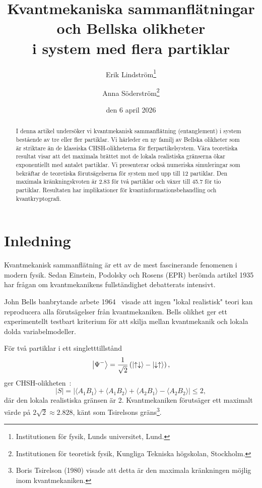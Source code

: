 \documentclass[12pt,a4paper]{article}
\title{Kvantmekaniska sammanfl\"atningar och Bellska olikheter\\
i system med flera partiklar}
\author{%
  Erik Lindstr\"om\thanks{Institutionen f\"or fysik, Lunds universitet, Lund.}
  \and
  Anna S\"oderstr\"om\thanks{Institutionen f\"or teoretisk fysik,
  Kungliga Tekniska h\"ogskolan, Stockholm.}
}
\date{den 6 april 2026}
\theoremstyle{plain}
\theoremstyle{definition}
\theoremstyle{remark}
\begin{document}
\maketitle

\begin{abstract}
I denna artikel unders\"oker vi kvantmekanisk sammanfl\"atning
(entanglement) i system best\r{a}ende av tre eller fler partiklar.
Vi h\"arleder en ny familj av Bellska olikheter som \"ar striktare
\"an de klassiska CHSH-olikheterna f\"or flerpartikelsystem.
V\r{a}ra teoretiska resultat visar att det maximala br\"attet mot
de lokala realistiska gr\"anserna \"okar exponentiellt med antalet
partiklar. Vi presenterar ocks\r{a} numeriska simuleringar som
bekr\"aftar de teoretiska f\"oruts\"agelserna f\"or system med upp till
12 partiklar. Den maximala kr\"ankningskvoten \"ar 2.83 f\"or tv\r{a}
partiklar och v\"axer till 45.7 f\"or tio partiklar. Resultaten
har implikationer f\"or kvantinformationsbehandling och
kvantkryptografi.
\end{abstract}

\tableofcontents

\section{Inledning}
\label{sec:inledning}

Kvantmekanisk sammanfl\"atning \"ar ett av de mest fascinerande
fenomenen i modern fysik. Sedan Einstein, Podolsky och Rosens
(EPR) ber\"omda artikel 1935~\citep{einstein1935} har fr\r{a}gan
om kvantmekanikens fullst\"andighet debatterats intensivt.

John Bells banbrytande arbete 1964~\citep{bell1964} visade att
ingen "lokal realistisk" teori kan reproducera alla
f\"oruts\"agelser fr\r{a}n kvantmekaniken. Bells olikhet ger ett
experimentellt testbart kriterium f\"or att skilja mellan
kvantmekanik och lokala dolda variabelmodeller.

F\"or tv\r{a} partiklar i ett singletttillst\r{a}nd
\begin{equation}
\label{eq:singlet}
\ket{\Psi^-} = \frac{1}{\sqrt{2}} \left( \ket{\uparrow\downarrow} - \ket{\downarrow\uparrow} \right),
\end{equation}
ger CHSH-olikheten~\citep{clauser1969}:
\begin{equation}
\label{eq:chsh}
|S| = |\langle A_1 B_1 \rangle + \langle A_1 B_2 \rangle + \langle A_2 B_1 \rangle - \langle A_2 B_2 \rangle| \leq 2,
\end{equation}
d\"ar den lokala realistiska gr\"ansen \"ar 2. Kvantmekaniken
f\"oruts\"ager ett maximalt v\"arde p\r{a} $2\sqrt{2} \approx 2.828$,
k\"ant som Tsirelsons gr\"ans\footnote{Boris Tsirelson (1980)
visade att detta \"ar den maximala kr\"ankningen m\"ojlig inom
kvantmekaniken.}.
\end{document}
